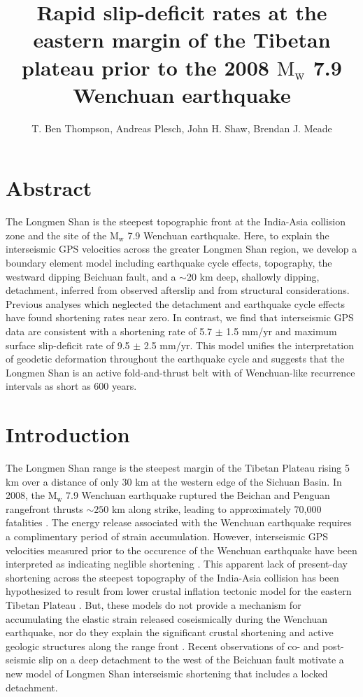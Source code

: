 \documentclass[12pt]{article}
\title{Rapid slip-deficit rates at the eastern margin of the Tibetan plateau prior to the 2008 $\textrm{M}_\textrm{w}$ 7.9 Wenchuan earthquake}
\author{T. Ben Thompson, Andreas Plesch, John H. Shaw, Brendan J. Meade}
\begin{document}
\maketitle

\section{Abstract}
The Longmen Shan is the steepest topographic front at the India-Asia collision zone and the site of the $\textrm{M}_{\textrm{w}}$ 7.9 Wenchuan earthquake. Here, to explain the interseismic GPS velocities across the greater Longmen Shan region, we develop a boundary element model including earthquake cycle effects, topography, the westward dipping Beichuan fault, and a ${\sim}$20 km deep, shallowly dipping, detachment, inferred from observed afterslip and from structural considerations. Previous analyses which neglected the detachment and earthquake cycle effects have found shortening rates near zero.  In contrast, we find that interseismic GPS data are consistent with a shortening rate of 5.7 $\pm$ 1.5 mm/yr and maximum surface slip-deficit rate of 9.5 $\pm$ 2.5 mm/yr. This model unifies the interpretation of geodetic deformation throughout the earthquake cycle and suggests that the Longmen Shan is an active fold-and-thrust belt with of Wenchuan-like recurrence intervals as short as 600 years.

\section{Introduction}
The Longmen Shan range is the steepest margin of the Tibetan Plateau rising 5 km over a distance of only 30 km at the western edge of the Sichuan Basin. In 2008, the $\textrm{M}_{\textrm{w}}$ 7.9 Wenchuan earthquake ruptured the Beichan and Penguan rangefront thrusts ${\sim}250$ km along strike, leading to approximately 70,000 fatalities \citep{Hubbard2009, Xu2009, Lin2009}. The energy release associated with the Wenchuan earthquake requires a complimentary period of strain accumulation. However, interseismic GPS velocities measured prior to the occurence of the Wenchuan earthquake have been interpreted as indicating neglible shortening \citep{king97, chen00, shen05, Meade07c, Loveless2011}. This apparent lack of present-day shortening across the steepest topography of the India-Asia collision has been hypothesized to result from lower crustal inflation tectonic model for the eastern Tibetan Plateau \citep{royden97, bird91, Burchfiel2008, Clark2000}. But, these models do not provide a mechanism for accumulating the elastic strain released coseismically during the Wenchuan earthquake, nor do they explain the significant crustal shortening and active geologic structures along the range front \citep{Hubbard2010, Li2010a, Wang2013, Wang2014}. Recent observations of co- and post-seismic slip on a deep detachment to the west of the Beichuan fault\citep{Qi2011, Fielding2013b} motivate a new model of Longmen Shan interseismic shortening that includes a locked detachment.
\end{document}
